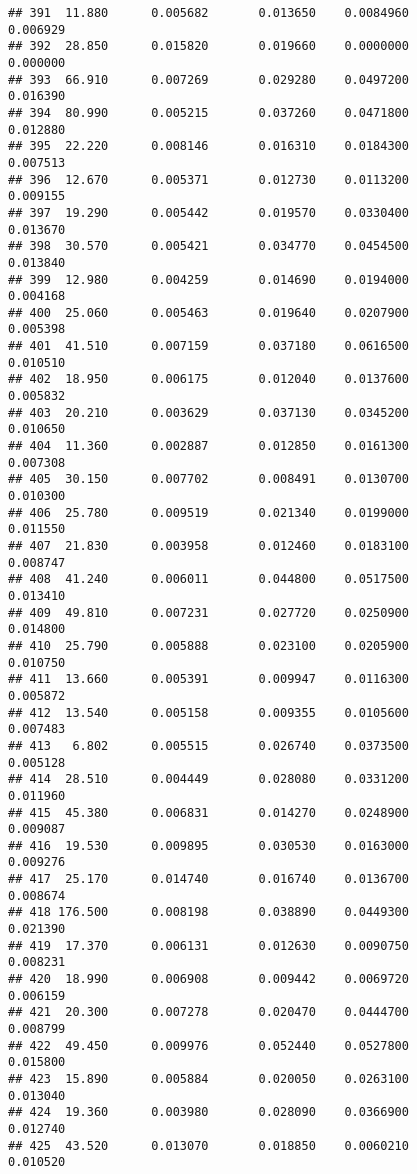 \documentclass[
]{article}
\begin{document}
\begin{verbatim}
## 391  11.880      0.005682       0.013650    0.0084960          0.006929
## 392  28.850      0.015820       0.019660    0.0000000          0.000000
## 393  66.910      0.007269       0.029280    0.0497200          0.016390
## 394  80.990      0.005215       0.037260    0.0471800          0.012880
## 395  22.220      0.008146       0.016310    0.0184300          0.007513
## 396  12.670      0.005371       0.012730    0.0113200          0.009155
## 397  19.290      0.005442       0.019570    0.0330400          0.013670
## 398  30.570      0.005421       0.034770    0.0454500          0.013840
## 399  12.980      0.004259       0.014690    0.0194000          0.004168
## 400  25.060      0.005463       0.019640    0.0207900          0.005398
## 401  41.510      0.007159       0.037180    0.0616500          0.010510
## 402  18.950      0.006175       0.012040    0.0137600          0.005832
## 403  20.210      0.003629       0.037130    0.0345200          0.010650
## 404  11.360      0.002887       0.012850    0.0161300          0.007308
## 405  30.150      0.007702       0.008491    0.0130700          0.010300
## 406  25.780      0.009519       0.021340    0.0199000          0.011550
## 407  21.830      0.003958       0.012460    0.0183100          0.008747
## 408  41.240      0.006011       0.044800    0.0517500          0.013410
## 409  49.810      0.007231       0.027720    0.0250900          0.014800
## 410  25.790      0.005888       0.023100    0.0205900          0.010750
## 411  13.660      0.005391       0.009947    0.0116300          0.005872
## 412  13.540      0.005158       0.009355    0.0105600          0.007483
## 413   6.802      0.005515       0.026740    0.0373500          0.005128
## 414  28.510      0.004449       0.028080    0.0331200          0.011960
## 415  45.380      0.006831       0.014270    0.0248900          0.009087
## 416  19.530      0.009895       0.030530    0.0163000          0.009276
## 417  25.170      0.014740       0.016740    0.0136700          0.008674
## 418 176.500      0.008198       0.038890    0.0449300          0.021390
## 419  17.370      0.006131       0.012630    0.0090750          0.008231
## 420  18.990      0.006908       0.009442    0.0069720          0.006159
## 421  20.300      0.007278       0.020470    0.0444700          0.008799
## 422  49.450      0.009976       0.052440    0.0527800          0.015800
## 423  15.890      0.005884       0.020050    0.0263100          0.013040
## 424  19.360      0.003980       0.028090    0.0366900          0.012740
## 425  43.520      0.013070       0.018850    0.0060210          0.010520

\end{verbatim}
\end{document}

